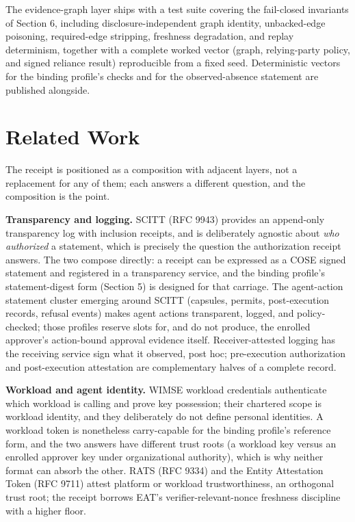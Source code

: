 \documentclass[11pt]{article}
\begin{document}
The evidence-graph layer ships with a test suite covering the fail-closed
invariants of Section 6, including disclosure-independent graph identity,
unbacked-edge poisoning, required-edge stripping, freshness degradation, and replay
determinism, together with a complete worked vector (graph, relying-party policy,
and signed reliance result) reproducible from a fixed seed. Deterministic vectors
for the binding profile's checks and for the observed-absence statement are
published alongside.

\section{Related Work}

The receipt is positioned as a composition with adjacent layers, not a replacement
for any of them; each answers a different question, and the composition is the
point.

\textbf{Transparency and logging.} SCITT (RFC 9943) provides an append-only
transparency log with inclusion receipts, and is deliberately agnostic about
\emph{who authorized} a statement, which is precisely the question the
authorization receipt answers. The two compose directly: a receipt can be expressed
as a COSE signed statement and registered in a transparency service, and the
binding profile's statement-digest form (Section 5) is designed for that carriage.
The agent-action statement cluster emerging around SCITT (capsules, permits,
post-execution records, refusal events) makes agent actions transparent, logged, and
policy-checked; those profiles reserve slots for, and do not produce, the enrolled
approver's action-bound approval evidence itself. Receiver-attested logging has the
receiving service sign what it observed, post hoc; pre-execution authorization and
post-execution attestation are complementary halves of a complete record.

\textbf{Workload and agent identity.} WIMSE workload credentials authenticate which
workload is calling and prove key possession; their chartered scope is workload
identity, and they deliberately do not define personal identities. A workload token
is nonetheless carry-capable for the binding profile's reference form, and the two
answers have different trust roots (a workload key versus an enrolled approver key under
organizational authority), which is why neither format can absorb the other. RATS
(RFC 9334) and the Entity Attestation Token (RFC 9711) attest platform or workload
trustworthiness, an orthogonal trust root; the receipt borrows EAT's
verifier-relevant-nonce freshness discipline with a higher floor.
\end{document}

